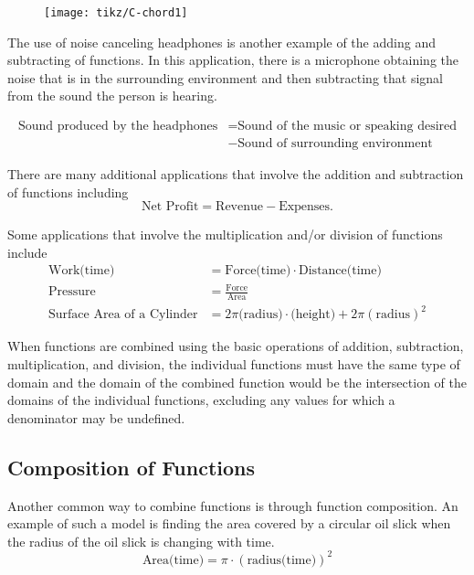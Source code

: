 \documentclass[
]{book}
\theoremstyle{definition}
\theoremstyle{definition}
\theoremstyle{definition}
\theoremstyle{definition}
\theoremstyle{remark}
\begin{document}
\begin{figure}

{\centering \texttt{[image: tikz/C-chord1]} 

}

\end{figure}

The use of noise canceling headphones is another example of the adding and subtracting of functions. In this application, there is a microphone obtaining the noise that is in the surrounding environment and then subtracting that signal from the sound the person is hearing.

\begin{align*}
\mbox{Sound produced by the headphones} &= \mbox{Sound of the music or speaking desired} \\
& -\mbox{Sound of surrounding environment}
\end{align*}

There are many additional applications that involve the addition and subtraction of functions including
\[\mbox{Net Profit} = \mbox{Revenue} -\mbox{Expenses}.\]

Some applications that involve the multiplication and/or division of functions include
\begin{align*}
    \mbox{Work(time)} &= \mbox{Force(time)} \cdot \mbox{Distance(time)} \\
    \mbox{Pressure} &= \frac{\mbox{Force}}{\mbox{Area}} \\
    \mbox{Surface Area of a Cylinder} &= 2\pi \mbox{(radius)}\cdot \mbox{(height)} + 2 \pi (\mbox{radius})^2 
\end{align*}

When functions are combined using the basic operations of addition, subtraction, multiplication, and division, the individual functions must have the same type of domain and the domain of the combined function would be the intersection of the domains of the individual functions, excluding any values for which a denominator may be undefined.

\hypertarget{composition-of-functions}{%
\subsection{Composition of Functions}\label{composition-of-functions}}

Another common way to combine functions is through function composition. An example of such a model is finding the area covered by a circular oil slick when the radius of the oil slick is changing with time.
\[\mbox{Area(time)} = \pi \cdot \left( \mbox{radius(time)} \right)^2\]
\end{document}
